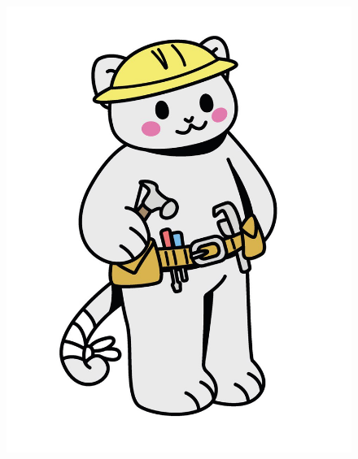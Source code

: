 

\begin{figure}[htbp]
    \centerline{\includegraphics[scale=.22]{assets/02_gatito_herramientas_matematicas.jpg}}
    \label{fig 1. Mapa para clasificar los lenguajes de programación.}        
\end{figure}


